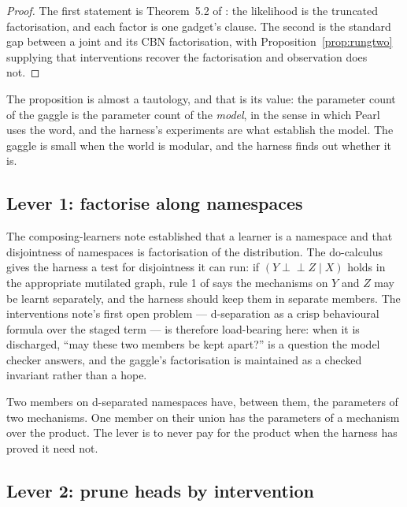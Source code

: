 \documentclass[11pt]{article}
\theoremstyle{plain}
\theoremstyle{definition}
\theoremstyle{remark}
\begin{document}
\begin{proof}
The first statement is Theorem~5.2 of \cite{Interventions}: the likelihood is
the truncated factorisation, and each factor is one gadget's clause. The second
is the standard gap between a joint and its CBN factorisation, with
Proposition~\ref{prop:rungtwo} supplying that interventions recover the
factorisation and observation does not.
\end{proof}

The proposition is almost a tautology, and that is its value: the parameter
count of the gaggle is the parameter count of the \emph{model}, in the sense in
which Pearl uses the word, and the harness's experiments are what establish the
model. The gaggle is small when the world is modular, and the harness finds out
whether it is.

\subsection{Lever 1: factorise along namespaces}

The composing-learners note \cite{Compose} established that a learner is a
namespace and that disjointness of namespaces is factorisation of the
distribution. The do-calculus gives the harness a test for disjointness it can
run: if $(Y \perp\!\!\!\perp Z \mid X)$ holds in the appropriate mutilated graph,
rule 1 of \cite[Cor.~5.4]{Interventions} says the mechanisms on $Y$ and $Z$ may
be learnt separately, and the harness should keep them in separate members.
The interventions note's first open problem --- d-separation as a crisp
behavioural formula over the staged term \cite[\S10]{Interventions} --- is
therefore load-bearing here:
when it is discharged, ``may these two members be kept apart?'' is a question
the model checker answers, and the gaggle's factorisation is maintained as a
checked invariant rather than a hope.

Two members on d-separated namespaces have, between them, the parameters of
two mechanisms. One member on their union has the parameters of a mechanism
over the product. The lever is to never pay for the product when the harness
has proved it need not.

\subsection{Lever 2: prune heads by intervention}
\end{document}
